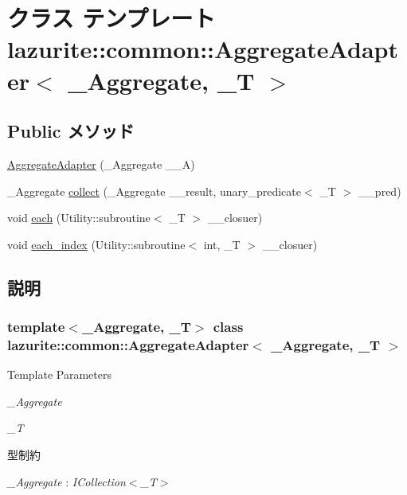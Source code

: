 \hypertarget{classlazurite_1_1common_1_1_aggregate_adapter_3_01___aggregate_00_01___t_01_4}{
\section{クラス テンプレート lazurite::common::AggregateAdapter$<$ \_\-Aggregate, \_\-T $>$}
\label{classlazurite_1_1common_1_1_aggregate_adapter_3_01___aggregate_00_01___t_01_4}
}
\subsection*{Public メソッド}
\begin{DoxyCompactItemize}
\item 
\hyperlink{classlazurite_1_1common_1_1_aggregate_adapter_3_01___aggregate_00_01___t_01_4_acbedd79a5cc7a91ad6e2808b09d972da}{AggregateAdapter} (\_\-Aggregate \_\-\_\-A)
\item 
\_\-Aggregate \hyperlink{classlazurite_1_1common_1_1_aggregate_adapter_3_01___aggregate_00_01___t_01_4_a666ebbc284a0dd48124b7915d901e9be}{collect} (\_\-Aggregate \_\-\_\-result, unary\_\-predicate$<$ \_\-T $>$ \_\-\_\-pred)
\item 
void \hyperlink{classlazurite_1_1common_1_1_aggregate_adapter_3_01___aggregate_00_01___t_01_4_adf4cf7ca29f1384fa7f7cc2363a7ec7b}{each} (Utility::subroutine$<$ \_\-T $>$ \_\-\_\-closuer)
\item 
void \hyperlink{classlazurite_1_1common_1_1_aggregate_adapter_3_01___aggregate_00_01___t_01_4_a671c6aa14225789354eb999f2c77fe7a}{each\_\-index} (Utility::subroutine$<$ int, \_\-T $>$ \_\-\_\-closuer)
\end{DoxyCompactItemize}


\subsection{説明}
\subsubsection*{template$<$\_\-Aggregate, \_\-T$>$ class lazurite::common::AggregateAdapter$<$ \_\-Aggregate, \_\-T $>$}


\begin{DoxyTemplParams}{Template Parameters}
\item[{\em \_\-Aggregate}]\item[{\em \_\-T}]\end{DoxyTemplParams}
\begin{Desc}
\item[型制約]\begin{description}
\item[{\em \_\-Aggregate} : {\em ICollection$<$\_\-T$>$}]\end{description}
\end{Desc}



